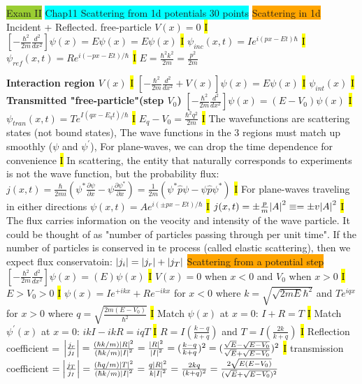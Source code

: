 \documentclass[fontsize=4pt]{scrartcl}
\begin{document}
\colorbox{YellowGreen}{Exam II}
\colorbox{Cyan}{Chap11 Scattering from 1d potentials 30 points}
\colorbox{Orange}{Scattering in 1d}
Incident + Reflected. free-particle $V(x) = 0$
\hl{I}
$[-\frac{\hbar^2}{2m}\frac{d^2}{dx^2}]\psi(x) = E \psi (x) = E\psi(x)$
\hl{I}
$\psi_{inc}(x,t) = Ie^{i(px-Et)\hbar}$
\hl{I}
$\psi_{ref}(x,t) = Re^{i(-px-Et)/\hbar}$
\hl{I}
$E=\frac{\hbar^2 k^2}{2m} = \frac{p^2}{2m}$

\textbf{Interaction region $V(x)$}
\hl{I}
$[-\frac{\hbar^2}{2m}\frac{d^2}{dx^2}+V(x)]\psi(x) = E\psi(x)$
\hl{I}
$\psi_{int} (x)$
\hl{I}
\textbf{Transmitted "free-particle"(step $V_0$)}
$[-\frac{\hbar^2}{2m}\frac{d^2}{dx^2}]\psi(x) = (E-V_0)\psi(x)$
\hl{I}
$\psi_{tran}(x,t) = Te^{I(qx-E_q t)/ \hbar}$
\hl{I}
$E_q - V_0 = \frac{\hbar^2 q^2}{2m}$
\hl{I}
The wavefunctions are scattering states (not bound states), The wave functions in the 3 regions must match up smoothly ($\psi$ and $\psi^{\prime}$), For plane-waves, we can drop the time dependence for convenience
\hl{I}
In scattering, the entity that naturally corresponds to experiments is not the wave function, but the probability flux: 
$j(x,t) = \frac{\hbar}{2mi}(\psi^{*}\frac{\partial \psi}{\partial x} - \psi \frac{\partial \psi^{*}}{\partial x}) = \frac{1}{2m} (\psi^{*} \hat{p} \psi - \psi \hat{p} \psi^{*})$
\hl{I}
For plane-waves traveling in either directions $\psi(x,t) = Ae^{i(\pm px-Et)/\hbar}$
\hl{I}
$j(x,t) = \pm \frac{p}{m} \abs{A}^2 \equiv = \pm v \abs{A}^2$
\hl{I}
The flux carries information on the veocity and intensity of the wave particle. It could be thought of as "number of particles passing through per unit time". If the number of particles is conserved in te process (called elastic scattering), then we expect flux conservatoin: $\abs{j_i} = \abs{j_r}+ \abs{j_T}$
\colorbox{Orange}{Scattering from a potential step}
$[-\frac{\hbar^2}{2m}\frac{d^2}{dx^2}]\psi(x) = (E)\psi(x)$
\hl{I}
$V(x) = 0$ when $x < 0$ and $V_0$ when $x>0$ 
\hl{I}
$E > V_0 > 0$
\hl{I}
$\psi(x) = Ie^{+ikx} + Re^{-ikx}$ for $x < 0$ where $k = \sqrt{\sqrt{2mE}{\hbar^2}}$ and $Te^{iqx}$ for $x>0$ where $q=\sqrt{\frac{2m(E-V_0)}{\hbar^2}}$
\hl{I}
Match $\psi(x)$ at $x=0$: $I + R = T$
\hl{I}
Match $\psi^{\prime}(x)$ at $x=0$: $ikI - ikR = iqT$
\hl{I}
$R=I(\frac{k-q}{k+q})$ and $T=I(\frac{2k}{k+q})$
\hl{I}
Reflection coefficient = $\abs{\frac{j_r}{j_I}} = \frac{(\hbar k / m)\abs{R}^2}{(\hbar k  / m)\abs{I}^2} =  \frac{\abs{R}^2}{\abs{I}^2} = (\frac{k-q}{k+q})^2 = (\frac{\sqrt{E}- \sqrt{E-V_0}}{\sqrt{E}+\sqrt{E-V_0}})^2$
\hl{I}
transmission coefficient $= \abs{\frac{j_T}{j_I}} = \frac{(\hbar q / m)\abs{T}^2}{(\hbar k  / m)\abs{I}^2} =  \frac{q\abs{R}^2}{k\abs{I}^2} = \frac{2kq}{(k+q)^2} = \frac{2\sqrt{E(E-V_0)}}{(\sqrt{E}+\sqrt{E-V_0})^2}$
\end{document}
